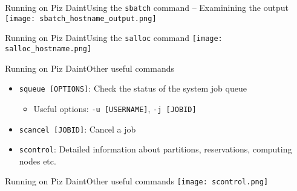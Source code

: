 \begin{frame}[fragile]{Running on Piz Daint}{Using the \texttt{sbatch} command -- Examinining the output}
  {
    \centering
    \texttt{[image: sbatch\_hostname\_output.png]}
  }
\end{frame}

\begin{frame}[fragile]{Running on Piz Daint}{Using the \texttt{salloc} command}
  {
    \centering
    \texttt{[image: salloc\_hostname.png]}
  }
\end{frame}

\begin{frame}{Running on Piz Daint}{Other useful commands}
  \begin{itemize}
  \item \texttt{squeue [OPTIONS]}: Check the status of the system job queue
    \begin{itemize}
    \item Useful options: \texttt{-u [USERNAME]}, \texttt{-j [JOBID]}
    \end{itemize}
  \item \texttt{scancel [JOBID]}: Cancel a job
  \item \texttt{scontrol}: Detailed information about partitions, reservations,
    computing nodes etc.
  \end{itemize}
\end{frame}

\begin{frame}{Running on Piz Daint}{Other useful commands}
  {
    \centering
    \texttt{[image: scontrol.png]}
  }
\end{frame}
